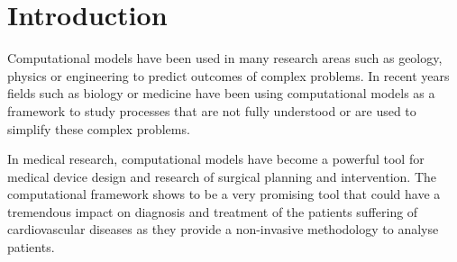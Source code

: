 \chapter{Introduction}
\label{chapterlabel1}

Computational models have been used in many research areas such as geology, physics or engineering to predict outcomes of complex problems. In recent years fields such as biology or medicine have been using computational models as a framework to study processes that are not fully understood or are used to simplify these complex problems. \par

In medical research, computational models have become a powerful tool for medical device design and research of surgical planning and intervention. The computational framework shows to be a very promising tool that could have a tremendous impact  on diagnosis and treatment of the patients suffering of cardiovascular diseases as they provide a non-invasive methodology to analyse patients.
